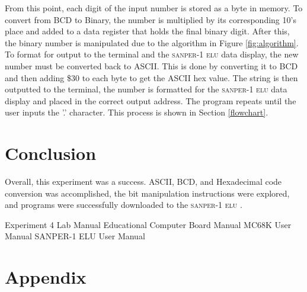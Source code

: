 \documentclass[12pt, twocolumn]{article}
\newcommand{\sanper}{\textsc{sanper-1 elu} }
\begin{document}
From this point, each digit of the input number is stored as a byte in memory. To convert from BCD to Binary, the number is multiplied by its corresponding 10's place and added to a data register that holds the final binary digit. After this, the binary number is manipulated due to the algorithm in Figure \ref{fig:algorithm}. To format for output to the terminal and the \sanper data display, the new number must be converted back to ASCII. This is done by converting it to BCD and then adding \$30 to each byte to get the ASCII hex value. The string is then outputted to the terminal, the number is formatted for the \sanper data display and placed in the correct output address. The program repeats until the user inputs the '.' character. This process is shown in Section \ref{flowchart}.

\section{Conclusion} 
Overall, this experiment was a success. ASCII, BCD, and Hexadecimal code conversion was accomplished, the bit manipulation instructions were explored, and programs were successfully downloaded to the \sanper.

\begin{thebibliography}{1}
	 Experiment 4 Lab Manual
	 Educational Computer Board Manual
	MC68K User Manual
	SANPER-1 ELU User Manual
	
	
\end{thebibliography}
  
\onecolumn
\section{Appendix}
\label{appendix}
\end{document}
